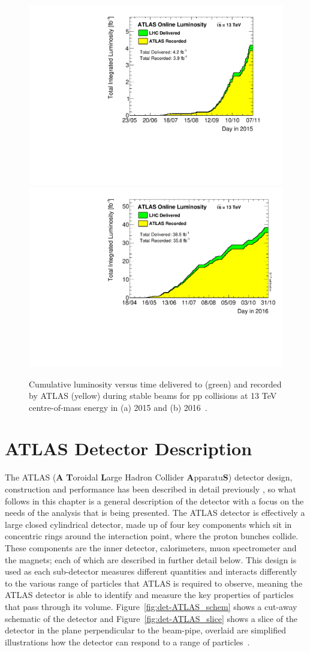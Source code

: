 \begin{figure}[!ht]
  \begin{center}
    \includegraphics[width=0.45\linewidth, angle=0]{figs/Detector/lumi_2015.pdf}
    \includegraphics[width=0.45\linewidth, angle=0]{figs/Detector/lumi_2016.pdf}
  \end{center}
  \caption[Cumulative luminosity versus time delivered to (green) and recorded by ATLAS (yellow) during stable beams for pp collisions at 13 TeV centre-of-mass energy in (a) 2015 and (b) 2016]
      {Cumulative luminosity versus time delivered to (green) and recorded by ATLAS (yellow) during stable beams for pp collisions at 13 TeV centre-of-mass energy in (a) 2015 and (b) 2016~\cite{det-ATLAS_lumi_twiki}.}
  \label{fig:det-lumi_2015_2016}
\end{figure}

\section{ATLAS Detector Description}
\label{sec:det-ATLAS}

The ATLAS (\textbf{A} \textbf{T}oroidal \textbf{L}arge Hadron Collider \textbf{A}pparatu\textbf{S}) detector
design, construction and performance has been described in detail previously
\cite{det-ATLAS_Exp, det-ATLAS_TDR, det-ATLAS_Perf},
so what follows in this chapter is a general description of the detector with a focus on the
needs of the analysis that is being presented.
The ATLAS detector is effectively a large closed cylindrical detector,
made up of four key components which sit in concentric rings around the interaction point, where the proton bunches collide.
These components are the inner detector, calorimeters, muon spectrometer and the magnets; each of which are described in further detail below.
This design is used as each sub-detector measures different quantities and interacts differently to the various range of particles that ATLAS is required to observe,
meaning the ATLAS detector is able to identify and measure the key properties of particles that pass through its volume.
Figure~\ref{fig:det-ATLAS_schem} shows a cut-away schematic of the detector
and Figure~\ref{fig:det-ATLAS_slice} shows a slice of the detector in the plane perpendicular to the beam-pipe,
overlaid are simplified illustrations how the detector can respond to a range of particles~\cite{det-thesis_gutchow}.


